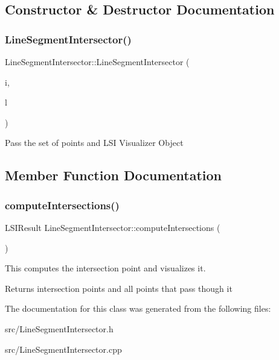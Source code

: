 \subsection{Constructor \& Destructor Documentation}
\mbox{\label{classLineSegmentIntersector_abfe17083938ad4ee705fbe7d0051f209}} 
\subsubsection{\texorpdfstring{Line\+Segment\+Intersector()}{LineSegmentIntersector()}}
{\footnotesize\ttfamily Line\+Segment\+Intersector\+::\+Line\+Segment\+Intersector (\begin{DoxyParamCaption}\item[{std\+::vector$<$ \hyperlink{classLineSegment}{Line\+Segment} $>$ \&}]{i,  }\item[{\hyperlink{classLSIGraphix}{L\+S\+I\+Graphix} \&}]{l }\end{DoxyParamCaption})}

Pass the set of points and L\+SI Visualizer Object 

\subsection{Member Function Documentation}
\mbox{\label{classLineSegmentIntersector_a261dcce43777e1954e81589ca89529ee}} 
\subsubsection{\texorpdfstring{compute\+Intersections()}{computeIntersections()}}
{\footnotesize\ttfamily L\+S\+I\+Result Line\+Segment\+Intersector\+::compute\+Intersections (\begin{DoxyParamCaption}{ }\end{DoxyParamCaption})}

This computes the intersection point and visualizes it. \begin{DoxyReturn}{Returns}
intersection points and all points that pass though it 
\end{DoxyReturn}


The documentation for this class was generated from the following files\+:\begin{DoxyCompactItemize}
\item 
src/Line\+Segment\+Intersector.\+h\item 
src/Line\+Segment\+Intersector.\+cpp\end{DoxyCompactItemize}
